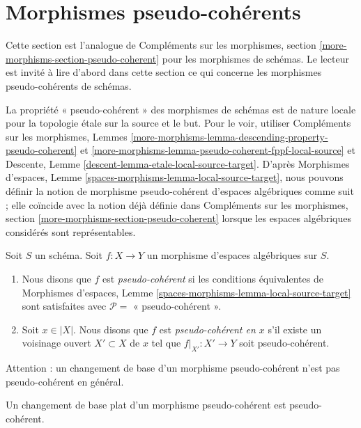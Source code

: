 \section{Morphismes pseudo-cohérents}
\label{section-pseudo-coherent}

\noindent
Cette section est l'analogue de
Compléments sur les morphismes, section \ref{more-morphisms-section-pseudo-coherent}
pour les morphismes de schémas. Le lecteur est invité à lire d'abord
dans cette section ce qui concerne les morphismes pseudo-cohérents de schémas.

\medskip\noindent
La propriété « pseudo-cohérent » des morphismes de schémas est
de nature locale pour la topologie étale sur la source et le but. Pour le voir, utiliser
Compléments sur les morphismes,
Lemmes \ref{more-morphisms-lemma-descending-property-pseudo-coherent} et
\ref{more-morphisms-lemma-pseudo-coherent-fppf-local-source}
et
Descente, Lemme \ref{descent-lemma-etale-local-source-target}.
D'après
Morphismes d'espaces,
Lemme \ref{spaces-morphisms-lemma-local-source-target},
nous pouvons définir la notion de morphisme pseudo-cohérent d'espaces algébriques comme
suit ; elle coïncide avec la notion déjà définie dans
Compléments sur les morphismes, section \ref{more-morphisms-section-pseudo-coherent}
lorsque les espaces algébriques considérés sont représentables.

\begin{definition}
\label{definition-pseudo-coherent}
Soit $S$ un schéma.
Soit $f : X \to Y$ un morphisme d'espaces algébriques sur $S$.
\begin{enumerate}
\item Nous disons que $f$ est {\it pseudo-cohérent} si les conditions équivalentes de
Morphismes d'espaces, Lemme \ref{spaces-morphisms-lemma-local-source-target}
sont satisfaites avec $\mathcal{P} =$ « pseudo-cohérent ».
\item Soit $x \in |X|$. Nous disons que $f$ est {\it pseudo-cohérent en $x$} s'il
existe un voisinage ouvert $X' \subset X$ de $x$ tel
que $f|_{X'} : X' \to Y$ soit pseudo-cohérent.
\end{enumerate}
\end{definition}

\noindent
Attention : un changement de base d'un morphisme pseudo-cohérent n'est pas
pseudo-cohérent en général.

\begin{lemma}
\label{lemma-flat-base-change-pseudo-coherent}
Un changement de base plat d'un morphisme pseudo-cohérent est pseudo-cohérent.
\end{lemma}

